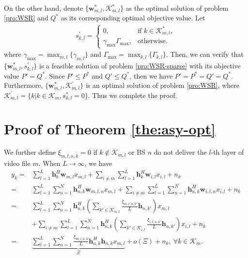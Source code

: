 \documentclass[12pt, draftclsnofoot, onecolumn]{IEEEtran}
\begin{document}
On the other hand, denote $\{\mathbf{w}_{m,l}^*, \mathcal{K}_{m,l}^*\}$ as the optimal solution of problem \eqref{pro:WSR} and $Q^*$ as its corresponding optimal objective value. Let
\begin{align}
 s_{k,l}^{'} = 
 \begin{cases}
	0, &\text{if } k \in \mathcal{K}_{m,l}^*, \\
	\gamma_{\text{max}} \Gamma_{\text{max}}, &\text{otherwise.}
\end{cases} \nonumber
\end{align}
where $\gamma_{\text{max}} = \max_{m,l} \{\gamma_{m,l} \}$ and $\Gamma_{\text{max}} = \max_{k,l} \{\Gamma_{k,l}\}$. 
Then, we can verify that $\{\mathbf{w}_{m,l}^*, s_{k,l}^{'}\}$ is a feasible solution of problem \eqref{pro:WSR-sparse} with its objective value $P' = Q^*$. Since $P' \leq P^*$ and $Q' \leq Q^*$, then we have $P' = P^* = Q' = Q^*$. Furthermore, $\{\mathbf{w}_{m,l}^*, \mathcal{K}_{m,l}^{'}\}$ is an optimal solution of problem \eqref{pro:WSR}, where $\mathcal{K}_{m,l}^{'} = \{k | k \in \mathcal{K}_m, s_{k,l}^* = 0 \}$. Thus we complete the proof. 

\section{Proof of Theorem \ref{the:asy-opt}} \label{app:proof-of-theorem-asy-opt}
We further define $\xi_{m,l,n,k} = 0$ if $k \notin \mathcal{K}_{m,l}$ or BS $n$ do not deliver the $l$-th layer of video file $m$. 
When $L \to \infty$, we have
\begin{align}
y_{k} = &\sum_{l = 1}^L \mathbf{h}_k^H \mathbf{w}_{m,l} x_{m,l} + \sum_{i \neq m} \sum_{l = 1}^L \mathbf{h}_k^H \mathbf{w}_{i, l} x_{i,l} + n_k \\
= &\sum_{l = 1}^L \sum_{n = 1}^N \mathbf{h}_{n,k}^H \mathbf{w}_{m,l,n}  x_{m,l} + \sum_{i \neq m} \sum_{l = 1}^L \sum_{n = 1}^N \mathbf{h}_{n,k}^H \mathbf{w}_{i,l,n} x_{i,l} + n_k \\
= &\sum_{l = 1}^L \sum_{n = 1}^N \mathbf{h}_{n,k}^H \left(\sum_{k' \in \mathcal{K}_{m,l}} \frac{\xi_{m,l,n,k'}}{L} \mathbf{h}_{n,k'} \right) x_{m,l} \\ &+ \sum_{i \neq m} \sum_{l = 1}^L \sum_{n = 1}^N \mathbf{h}_{n,k}^H \left(\sum_{k' \in \mathcal{K}_{i,l}} \frac{\xi_{i,l,n,k'}}{L} \mathbf{h}_{n,k'} \right) x_{i,l} + n_k \\
= &\underbrace{\sum_{l=1}^L \sum_{n = 1}^N \frac{\xi_{m,l,n,k}}{L} \mathbf{h}_{n,k}^H \mathbf{h}_{n,k} x_{m,l}}_{\Xi} + o(\Xi) + n_k,~\forall k \in \mathcal{K}_{m}.
\end{align}
\end{document}
